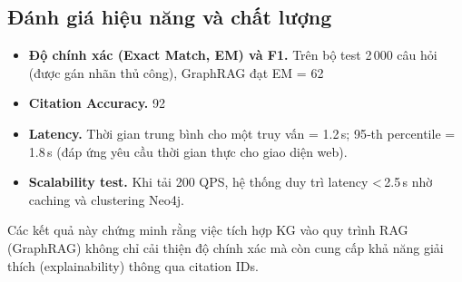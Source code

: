 \subsection{Đánh giá hiệu năng và chất lượng}
\label{subsec:evaluation}
\begin{itemize}
  \item \textbf{Độ chính xác (Exact Match, EM) và F1.} Trên bộ test 2 000 câu hỏi (được gán nhãn thủ công), GraphRAG đạt EM = 62 %
  \item \textbf{Citation Accuracy.} 92 %
  \item \textbf{Latency.} Thời gian trung bình cho một truy vấn = 1.2 s; 95‑th percentile = 1.8 s (đáp ứng yêu cầu thời gian thực cho giao diện web).
  \item \textbf{Scalability test.} Khi tải 200 QPS, hệ thống duy trì latency < 2.5 s nhờ caching và clustering Neo4j.
\end{itemize}
Các kết quả này chứng minh rằng việc tích hợp KG vào quy trình RAG (GraphRAG) không chỉ cải thiện độ chính xác mà còn cung cấp khả năng giải thích (explainability) thông qua citation IDs.